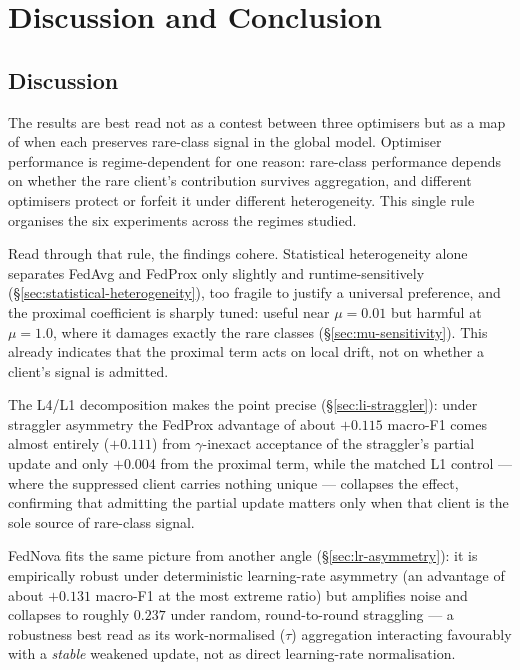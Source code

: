 \documentclass[11pt,a4paper]{report}
\begin{document}
\chapter{Discussion and Conclusion}
\label{ch:discussion}

\section{Discussion}
\label{sec:disc}

The results are best read not as a contest between three optimisers but as a map
of when each preserves rare-class signal in the global model. Optimiser
performance is regime-dependent for one reason: rare-class performance depends on
whether the rare client's contribution survives aggregation, and different
optimisers protect or forfeit it under different heterogeneity. This single rule
organises the six experiments across the regimes studied.


Read through that rule, the findings cohere. Statistical heterogeneity alone
separates FedAvg and FedProx only slightly and runtime-sensitively
(\S\ref{sec:statistical-heterogeneity}), too fragile to justify a universal
preference, and the proximal coefficient is sharply tuned: useful near
$\mu = 0.01$ but harmful at $\mu = 1.0$, where it damages exactly the rare classes
(\S\ref{sec:mu-sensitivity}). This already indicates that the proximal term acts
on local drift, not on whether a client's signal is admitted.

The L4/L1 decomposition makes the point precise (\S\ref{sec:li-straggler}): under straggler
asymmetry the FedProx advantage of about $+0.115$ macro-F1 comes almost entirely
($+0.111$) from $\gamma$-inexact acceptance of the straggler's partial update and
only $+0.004$ from the proximal term, while the matched L1 control --- where the
suppressed client carries nothing unique --- collapses the effect, confirming that
admitting the partial update matters only when that client is the sole source of
rare-class signal.

FedNova fits the same picture from another angle
(\S\ref{sec:lr-asymmetry}): it is empirically robust under deterministic
learning-rate asymmetry (an advantage of about $+0.131$ macro-F1 at the most
extreme ratio) but amplifies noise and collapses to roughly $0.237$ under random,
round-to-round straggling --- a robustness best read as its work-normalised
($\tau$) aggregation interacting favourably with a \emph{stable} weakened update,
not as direct learning-rate normalisation.
\end{document}
